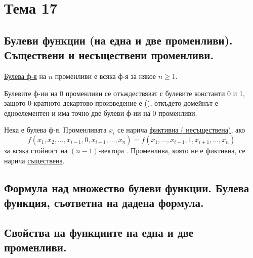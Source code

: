 \section{Тема 17}

\subsection*{Булеви функции (на една и две променливи). Съществени и несъществени променливи.}

\begin{note}
\end{note}

\begin{definition}
    \underline{Булева ф-я} на \(n\) променливи е всяка ф-я  за някое \(n \ge 1\).
\end{definition}

Булевите ф-ии на 0 променливи се отъждествяват с булевите константи 0 и 1, защото 0-кратното декартово 
произведение е {()}, откъдето домейнът е едноелементен и има точно две булеви ф-ии на 0 променливи.

\begin{definition}
    Нека  е булева ф-я. Променливата \(x_i\) се нарича \underline{фиктивна (
    несъществена)}, ако
    \begin{equation*}
        f(x_1, x_2, ..., x_{i - 1}, 0, x_{i + 1}, ..., x_n) = f(x_1, ..., x_{i - 1}, 1, x_{i + 1}, ..., x_n)
    \end{equation*}
    за всяка стойност на \((n - 1)\)-вектора .
    Променлива, която не е фиктивна, се нарича \underline{съществена}.
\end{definition}

\subsection*{Формула над множество булеви функции. Булева функция, съответна на дадена формула.}



\subsection*{Свойства на функциите на една и две променливи.}

